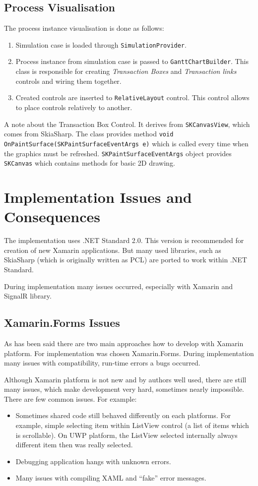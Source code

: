\subsection{Process Visualisation}
The process instance visualisation is done as follows:
\begin{enumerate}
\item Simulation case is loaded through \texttt{SimulationProvider}.
\item Process instance from simulation case is passed to \texttt{GanttChartBuilder}. This class is responsible for creating \textit{Transaction Boxes} and \textit{Transaction links} controls and wiring them together.
\item Created controls are inserted to \texttt{RelativeLayout} control. This control allows to place controls relatively to another. 
\end{enumerate}

A note about the Transaction Box Control. It derives from \texttt{SKCanvasView}, which comes from SkiaSharp. The class provides method \texttt{void OnPaintSurface(SKPaintSurfaceEventArgs e)} which is called every time when the graphics must be refreshed. \texttt{SKPaintSurfaceEventArgs} object provides \texttt{SKCanvas} which contains methods for basic 2D drawing. 
\section{Implementation Issues and Consequences}
The implementation uses .NET Standard 2.0. This version is recommended for creation of new Xamarin applications. But many used libraries, such as SkiaSharp (which is originally written as PCL) are ported to work within .NET Standard.

During implementation many issues occurred, especially with Xamarin and SignalR library.

\subsection{Xamarin.Forms Issues}
As has been said there are two main approaches how to develop with Xamarin platform. For implementation was chosen Xamarin.Forms. During implementation many issues with compatibility, run-time errors a bugs occurred. 

Although Xamarin platform is not new and by authors well used, there are still many issues, which make development very hard, sometimes nearly impossible. There are few common issues. For example:
\begin{itemize}
\item Sometimes shared code still behaved differently on each platforms. For example, simple selecting item within ListView control (a list of items which is scrollable). On UWP platform, the ListView selected internally always different item then was really selected. 
\item Debugging application hangs with unknown errors.
\item Many issues with compiling XAML and ``fake'' error messages. 
\end{itemize}

